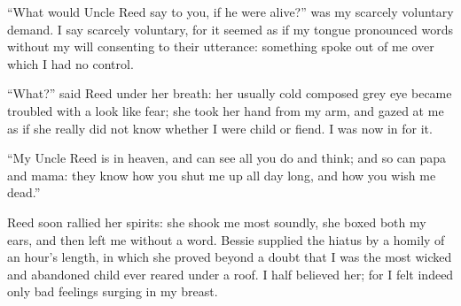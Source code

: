 \enquote{What would Uncle Reed say to you, if he were alive?} was my
scarcely voluntary demand. I say scarcely voluntary, for it seemed as
if my tongue pronounced words without my will consenting to their
utterance: something spoke out of me over which I had no control.

\enquote{What?} said \Mrs{} Reed under her breath: her usually cold
composed grey eye became troubled with a look like fear; she took her
hand from my arm, and gazed at me as if she really did not know whether
I were child or fiend. I was now in for it.

\enquote{My Uncle Reed is in heaven, and can see all you do and think;
	and so can papa and mama: they know how you shut me up all day long, and
	how you wish me dead.}

\Mrs{} Reed soon rallied her spirits: she shook me most soundly, she boxed
both my ears, and then left me without a word. Bessie supplied the
hiatus by a homily of an hour's length, in which she proved beyond a
doubt that I was the most wicked and abandoned child ever reared under a
roof. I half believed her; for I felt indeed only bad feelings surging
in my breast.

